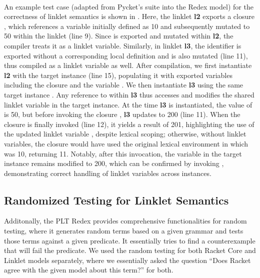 		\paragraph{}%
			An example test case (adapted from Pycket's suite into the Redex model) for the correctness of linklet semantics is shown in . Here, the linklet \textbf{l2} exports a closure , which references a variable  initially defined as 10 and subsequently mutated to 50 within the linklet (line 9). Since  is exported and mutated within \textbf{l2}, the compiler treats it as a linklet variable. Similarly, in linklet \textbf{l3}, the identifier  is exported without a corresponding local definition and is also mutated (line 11), thus compiled as a linklet variable as well. After compilation, we first instantiate \textbf{l2} with the target instance  (line 15), populating it with exported variables including the closure  and the variable . We then instantiate \textbf{l3} using the same target instance . Any reference to  within \textbf{l3} thus accesses and modifies the shared linklet variable in the target instance. At the time \textbf{l3} is instantiated, the value of  is 50, but before invoking the closure , \textbf{l3} updates  to 200 (line 11). When the closure  is finally invoked (line 12), it yields a result of 201, highlighting the use of the updated linklet variable , despite lexical scoping; otherwise, without linklet variables, the closure would have used the original lexical environment in which  was 10, returning 11. Notably, after this invocation, the variable  in the target instance  remains modified to 200, which can be confirmed by invoking , demonstrating correct handling of linklet variables across instances.

		\subsection{Randomized Testing for Linklet Semantics}


			\begin{paragraph-here}%
				Additonally, the PLT Redex provides comprehensive functionalities for random testing, where it generates random terms based on a given grammar and tests those terms against a given predicate. It essentially tries to find a counterexample that will fail the predicate. We used the random testing for both Racket Core and Linklet models separately, where we essentially asked the question “Does Racket agree with the given model about this term?” for both.
			\end{paragraph-here}

